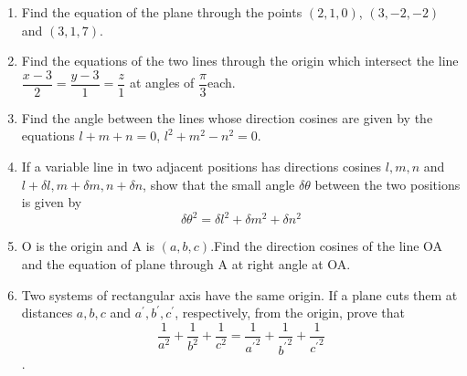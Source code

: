 \documentclass[12pt]{article}
\begin{document}
\begin{enumerate}
\item Find the equation of the plane through the points $(2,1,0)$, $(3,-2,-2)$ and $(3,1,7)$.
\item Find the equations of the two lines through the origin which intersect the line $ \dfrac{x-3}{2}=\dfrac{y-3}{1}=\dfrac{z}{1}$ at angles of  $\dfrac{\pi}{3}$each.
\item Find the angle between the lines whose direction cosines are given by the equations $l+m+n=0$, $l^2+m^2-n^2=0$.
\item If a variable line in two adjacent positions has directions cosines $l, m, n$ and $l+\delta l, m+\delta m, n+\delta n$, show that the small angle $\delta\theta$ between the two positions is given by $$\delta\theta^2=\delta l^2+\delta m^2+\delta n^2$$ 
\item O is the origin and A is $(a,b,c)$.Find the direction cosines of the line OA and the equation of plane through A at right angle at OA.
\item Two systems of rectangular axis have the same origin. If a plane cuts them at distances $a,b,c$ and $a^{\prime},b^{\prime},c^{\prime}$, respectively, from the origin, prove that $$\frac{1}{a^2}+\frac{1}{b^2}+\frac{1}{c^2}=\frac{1}{{a^{\prime}}^2}+\frac{1}{{b^{\prime}}^2}+\frac{1}{{c^{\prime}}^2}$$.
\end{enumerate}
\end{document}
